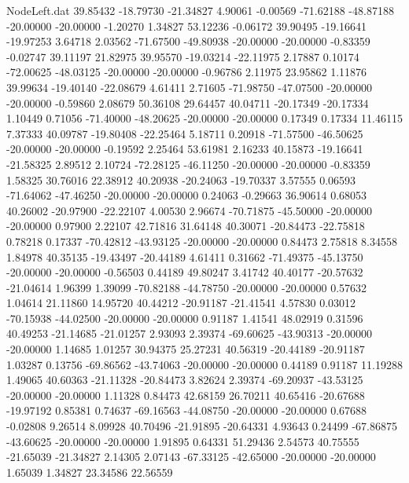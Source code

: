 \begin{filecontents}{NodeLeft.dat}
  39.85432  -18.79730  -21.34827     4.90061   -0.00569  -71.62188  -48.87188  -20.00000  -20.00000   -1.20270    1.34827   53.12236   -0.06172
  39.90495  -19.16641  -19.97253     3.64718    2.03562  -71.67500  -49.80938  -20.00000  -20.00000   -0.83359   -0.02747   39.11197   21.82975
  39.95570  -19.03214  -22.11975     2.17887    0.10174  -72.00625  -48.03125  -20.00000  -20.00000   -0.96786    2.11975   23.95862    1.11876
  39.99634  -19.40140  -22.08679     4.61411    2.71605  -71.98750  -47.07500  -20.00000  -20.00000   -0.59860    2.08679   50.36108   29.64457
  40.04711  -20.17349  -20.17334     1.10449    0.71056  -71.40000  -48.20625  -20.00000  -20.00000    0.17349    0.17334   11.46115    7.37333
  40.09787  -19.80408  -22.25464     5.18711    0.20918  -71.57500  -46.50625  -20.00000  -20.00000   -0.19592    2.25464   53.61981    2.16233
  40.15873  -19.16641  -21.58325     2.89512    2.10724  -72.28125  -46.11250  -20.00000  -20.00000   -0.83359    1.58325   30.76016   22.38912
  40.20938  -20.24063  -19.70337     3.57555    0.06593  -71.64062  -47.46250  -20.00000  -20.00000    0.24063   -0.29663   36.90614    0.68053
  40.26002  -20.97900  -22.22107     4.00530    2.96674  -70.71875  -45.50000  -20.00000  -20.00000    0.97900    2.22107   42.71816   31.64148
  40.30071  -20.84473  -22.75818     0.78218    0.17337  -70.42812  -43.93125  -20.00000  -20.00000    0.84473    2.75818    8.34558    1.84978
  40.35135  -19.43497  -20.44189     4.61411    0.31662  -71.49375  -45.13750  -20.00000  -20.00000   -0.56503    0.44189   49.80247    3.41742
  40.40177  -20.57632  -21.04614     1.96399    1.39099  -70.82188  -44.78750  -20.00000  -20.00000    0.57632    1.04614   21.11860   14.95720
  40.44212  -20.91187  -21.41541     4.57830    0.03012  -70.15938  -44.02500  -20.00000  -20.00000    0.91187    1.41541   48.02919    0.31596
  40.49253  -21.14685  -21.01257     2.93093    2.39374  -69.60625  -43.90313  -20.00000  -20.00000    1.14685    1.01257   30.94375   25.27231
  40.56319  -20.44189  -20.91187     1.03287    0.13756  -69.86562  -43.74063  -20.00000  -20.00000    0.44189    0.91187   11.19288    1.49065
  40.60363  -21.11328  -20.84473     3.82624    2.39374  -69.20937  -43.53125  -20.00000  -20.00000    1.11328    0.84473   42.68159   26.70211
  40.65416  -20.67688  -19.97192     0.85381    0.74637  -69.16563  -44.08750  -20.00000  -20.00000    0.67688   -0.02808    9.26514    8.09928
  40.70496  -21.91895  -20.64331     4.93643    0.24499  -67.86875  -43.60625  -20.00000  -20.00000    1.91895    0.64331   51.29436    2.54573
  40.75555  -21.65039  -21.34827     2.14305    2.07143  -67.33125  -42.65000  -20.00000  -20.00000    1.65039    1.34827   23.34586   22.56559

\end{filecontents}
